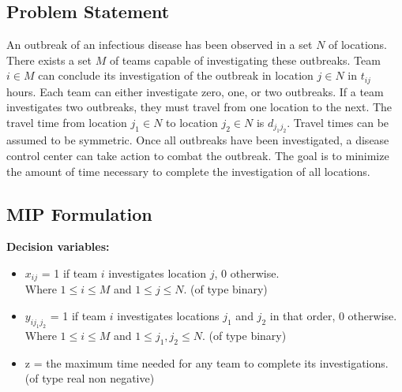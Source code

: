 \documentclass[a4paper,10pt]{article}
\begin{document}
\subsection*{Problem Statement}
An outbreak of an infectious disease has been observed in a set $N$ of locations. There exists a set $M$ of teams capable of investigating these outbreaks. Team $i \in M$ can conclude its investigation of the outbreak in location $j \in N$ in $t_{ij}$ hours. Each team can either investigate zero, one, or two outbreaks. If a team investigates two outbreaks, they must travel from one location to the next. The travel time from location $j_1 \in N$ to location $j_2 \in N$ is $d_{j_1 j_2}$. Travel times can be assumed to be symmetric. Once all outbreaks have been investigated, a disease control center can take action to combat the outbreak. The goal is to minimize the amount of time necessary to complete the investigation of all locations.

\subsection*{MIP Formulation}
\textbf{Decision variables:}
\begin{itemize}
  \item \(x_{ij}\) = 1 if team \(i\) investigates location \(j\), 0 otherwise.\\
  Where \(1 \leq i \leq M\) and \(1 \leq j \leq N\). (of type binary)
  \item \(y_{ij_1j_2}\) = 1 if team \(i\) investigates locations \(j_1\) and \(j_2\) in that order, 0 otherwise.\\
  Where \(1 \leq i \leq M\) and \(1 \leq j_1, j_2 \leq N\). (of type binary)
  \item z = the maximum time needed for any team to complete its investigations. (of type real non negative)
\end{itemize}
\end{document}
